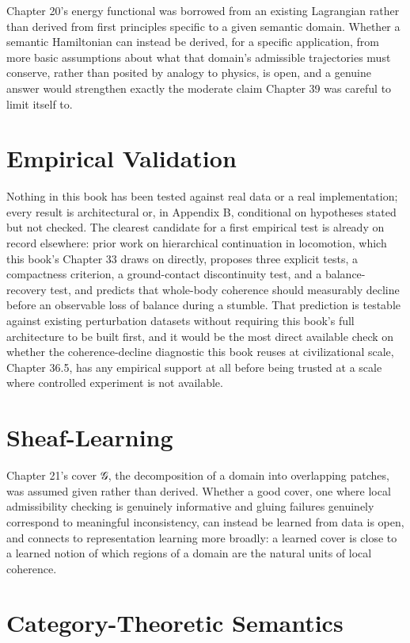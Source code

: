 Chapter 20's energy functional was borrowed from an existing Lagrangian rather than derived from first principles specific to a given semantic domain. Whether a semantic Hamiltonian can instead be derived, for a specific application, from more basic assumptions about what that domain's admissible trajectories must conserve, rather than posited by analogy to physics, is open, and a genuine answer would strengthen exactly the moderate claim Chapter 39 was careful to limit itself to.

\section{Empirical Validation}

Nothing in this book has been tested against real data or a real implementation; every result is architectural or, in Appendix B, conditional on hypotheses stated but not checked. The clearest candidate for a first empirical test is already on record elsewhere: prior work on hierarchical continuation in locomotion, which this book's Chapter 33 draws on directly, proposes three explicit tests, a compactness criterion, a ground-contact discontinuity test, and a balance-recovery test, and predicts that whole-body coherence should measurably decline before an observable loss of balance during a stumble. That prediction is testable against existing perturbation datasets without requiring this book's full architecture to be built first, and it would be the most direct available check on whether the coherence-decline diagnostic this book reuses at civilizational scale, Chapter 36.5, has any empirical support at all before being trusted at a scale where controlled experiment is not available.

\section{Sheaf-Learning}

Chapter 21's cover 𝒢, the decomposition of a domain into overlapping patches, was assumed given rather than derived. Whether a good cover, one where local admissibility checking is genuinely informative and gluing failures genuinely correspond to meaningful inconsistency, can instead be learned from data is open, and connects to representation learning more broadly: a learned cover is close to a learned notion of which regions of a domain are the natural units of local coherence.

\section{Category-Theoretic Semantics}

